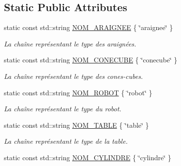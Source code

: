 \subsection*{Static Public Attributes}
\begin{DoxyCompactItemize}
\item 
\hypertarget{group__inf2990_ga1035430c1c08b95d17f891ae89b33b80}{}static const std\+::string \hyperlink{group__inf2990_ga1035430c1c08b95d17f891ae89b33b80}{N\+O\+M\+\_\+\+A\+R\+A\+I\+G\+N\+E\+E} \{ \char`\"{}araignee\char`\"{} \}\label{group__inf2990_ga1035430c1c08b95d17f891ae89b33b80}

\begin{DoxyCompactList}\small\item\em La chaîne représentant le type des araignées. \end{DoxyCompactList}\item 
\hypertarget{group__inf2990_gae849656178f4dad34106f525bf37341a}{}static const std\+::string \hyperlink{group__inf2990_gae849656178f4dad34106f525bf37341a}{N\+O\+M\+\_\+\+C\+O\+N\+E\+C\+U\+B\+E} \{ \char`\"{}conecube\char`\"{} \}\label{group__inf2990_gae849656178f4dad34106f525bf37341a}

\begin{DoxyCompactList}\small\item\em La chaîne représentant le type des cones-\/cubes. \end{DoxyCompactList}\item 
\hypertarget{group__inf2990_ga9a6799aa8903b858929bf675e4468aac}{}static const std\+::string \hyperlink{group__inf2990_ga9a6799aa8903b858929bf675e4468aac}{N\+O\+M\+\_\+\+R\+O\+B\+O\+T} \{ \char`\"{}robot\char`\"{} \}\label{group__inf2990_ga9a6799aa8903b858929bf675e4468aac}

\begin{DoxyCompactList}\small\item\em La chaîne représentant le type du robot. \end{DoxyCompactList}\item 
\hypertarget{group__inf2990_ga89e651c1a28481ce70f473bd15555114}{}static const std\+::string \hyperlink{group__inf2990_ga89e651c1a28481ce70f473bd15555114}{N\+O\+M\+\_\+\+T\+A\+B\+L\+E} \{ \char`\"{}table\char`\"{} \}\label{group__inf2990_ga89e651c1a28481ce70f473bd15555114}

\begin{DoxyCompactList}\small\item\em La chaîne représentant le type de la table. \end{DoxyCompactList}\item 
\hypertarget{group__inf2990_gae74e1de66e37dee6ef6cb6df82424c0d}{}static const std\+::string \hyperlink{group__inf2990_gae74e1de66e37dee6ef6cb6df82424c0d}{N\+O\+M\+\_\+\+C\+Y\+L\+I\+N\+D\+R\+E} \{ \char`\"{}cylindre\char`\"{} \}\label{group__inf2990_gae74e1de66e37dee6ef6cb6df82424c0d}


\end{DoxyCompactItemize}

